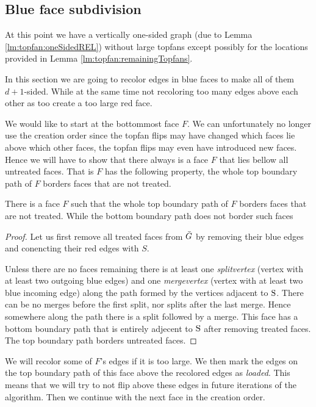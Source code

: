 
\subsection{Blue face subdivision}
\thispagestyle{plain}
\label{ss:subdiv}
  At this point we have a vertically one-sided graph (due to Lemma \ref{lm:topfan:oneSidedREL}) without large topfans except possibly for the locations provided in Lemma \ref{lm:topfan:remainingTopfans}.

  In this section we are going to recolor edges in blue faces to make all of them $d+1$-sided. While at the same time not recoloring too many edges above each other as too create a too large red face.

  We would like to start at the bottommost face $F$. We can unfortunately no longer use the creation order since the topfan flips may have changed which faces lie above which other faces, the topfan flips may even have introduced new faces. Hence we will have to show that there always is a face $F$  that lies bellow all untreated faces. That is $F$ has the following property, the whole top boundary path of $F$ borders faces that are not treated.

  \begin{lemma}
    \label{lm:}
    There is a face $F$ such that the whole top boundary path of $F$ borders faces that are not treated. While the bottom boundary path does not border such faces
  \end{lemma}
  \begin{proof}
    Let us first remove all treated faces from $\bar{G}$ by removing their blue edges and conencting their red edges with $S$.

    Unless there are no faces remaining there is at least one \emph{splitvertex} (vertex with at least two outgoing blue edges) and one \emph{mergevertex} (vertex with at least two blue incoming edge) along the path formed by the vertices adjacent to $\mathrm{S}$.
    There can be no merges before the first split, nor splits after the last merge.  Hence somewhere along the path there is a split followed by a merge. This face has a bottom boundary path that is entirely adjecent to $\mathrm{S}$ after removing treated faces. The top boundary path borders untreated faces.
  \end{proof}


  We will recolor some of $F$'s edges if it is too large.
  We then mark the edges on the top boundary path of this face above the recolored edges as \emph{loaded}. This means that we will try to not flip above these edges in future iterations of the algorithm.
  Then we continue with the next face in the creation order.

